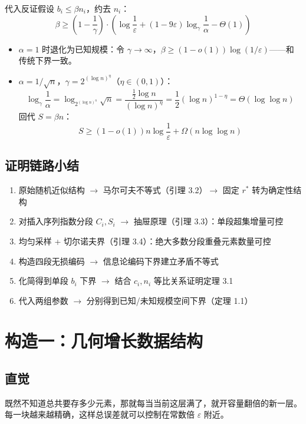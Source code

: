 \documentclass[UTF8,11pt,a4paper]{ctexart}
\begin{document}
代入反证假设 $b_i \le \beta n_i$，约去 $n_i$：
\[
\beta \ge \left(1 - \frac{1}{\gamma}\right) \cdot \left(\log\frac{1}{\varepsilon} + (1-9\varepsilon)\log_\gamma\frac{1}{\alpha} - \Theta(1)\right)
\]

\begin{itemize}
    \item $\alpha = 1$ 时退化为已知规模：令 $\gamma \to \infty$，$\beta \ge (1-o(1))\log(1/\varepsilon)$——和传统下界一致。
    \item $\alpha = 1/\sqrt{n}$，$\gamma = 2^{(\log n)^\eta}$（$\eta \in (0,1)$）：
    \[
    \log_\gamma\frac{1}{\alpha} = \log_{2^{(\log n)^\eta}}\sqrt{n} = \frac{\frac{1}{2}\log n}{(\log n)^\eta} = \frac{1}{2}(\log n)^{1-\eta} = \Theta(\log\log n)
    \]
    回代 $S = \beta n$：
    \[
    S \ge (1-o(1))n\log\frac{1}{\varepsilon} + \Omega(n\log\log n)
    \]
\end{itemize}

\subsection{证明链路小结}

\begin{enumerate}
    \item 原始随机近似结构 $\to$ 马尔可夫不等式（引理 3.2）$\to$ 固定 $r^*$ 转为确定性结构
    \item 对插入序列指数分段 $C_i, S_i$ $\to$ 抽屉原理（引理 3.3）：单段超集增量可控
    \item 均匀采样 + 切尔诺夫界（引理 3.4）：绝大多数分段重叠元素数量可控
    \item 构造四段无损编码 $\to$ 信息论编码下界建立矛盾不等式
    \item 化简得到单段 $b_i$ 下界 $\to$ 结合 $c_i, n_i$ 等比关系证明定理 3.1
    \item 代入两组参数 $\to$ 分别得到已知/未知规模空间下界（定理 1.1）
\end{enumerate}

\section{构造一：几何增长数据结构}

\subsection{直觉}

既然不知道总共要存多少元素，那就每当当前这层满了，就开容量翻倍的新一层。每一块越来越精确，这样总误差就可以控制在常数倍 $\varepsilon$ 附近。
\end{document}
